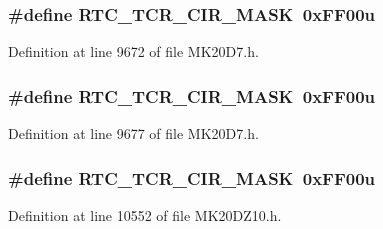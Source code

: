\subsubsection[{\texorpdfstring{R\+T\+C\+\_\+\+T\+C\+R\+\_\+\+C\+I\+R\+\_\+\+M\+A\+SK}{RTC_TCR_CIR_MASK}}]{\setlength{\rightskip}{0pt plus 5cm}\#define R\+T\+C\+\_\+\+T\+C\+R\+\_\+\+C\+I\+R\+\_\+\+M\+A\+SK~0x\+F\+F00u}\hypertarget{group___r_t_c___register___masks_ga8f198d1dbc7427e1dfabdc4e9f53f8e2}{}\label{group___r_t_c___register___masks_ga8f198d1dbc7427e1dfabdc4e9f53f8e2}


Definition at line 9672 of file M\+K20\+D7.\+h.

\subsubsection[{\texorpdfstring{R\+T\+C\+\_\+\+T\+C\+R\+\_\+\+C\+I\+R\+\_\+\+M\+A\+SK}{RTC_TCR_CIR_MASK}}]{\setlength{\rightskip}{0pt plus 5cm}\#define R\+T\+C\+\_\+\+T\+C\+R\+\_\+\+C\+I\+R\+\_\+\+M\+A\+SK~0x\+F\+F00u}\hypertarget{group___r_t_c___register___masks_ga8f198d1dbc7427e1dfabdc4e9f53f8e2}{}\label{group___r_t_c___register___masks_ga8f198d1dbc7427e1dfabdc4e9f53f8e2}


Definition at line 9677 of file M\+K20\+D7.\+h.

\subsubsection[{\texorpdfstring{R\+T\+C\+\_\+\+T\+C\+R\+\_\+\+C\+I\+R\+\_\+\+M\+A\+SK}{RTC_TCR_CIR_MASK}}]{\setlength{\rightskip}{0pt plus 5cm}\#define R\+T\+C\+\_\+\+T\+C\+R\+\_\+\+C\+I\+R\+\_\+\+M\+A\+SK~0x\+F\+F00u}\hypertarget{group___r_t_c___register___masks_ga8f198d1dbc7427e1dfabdc4e9f53f8e2}{}\label{group___r_t_c___register___masks_ga8f198d1dbc7427e1dfabdc4e9f53f8e2}


Definition at line 10552 of file M\+K20\+D\+Z10.\+h.

